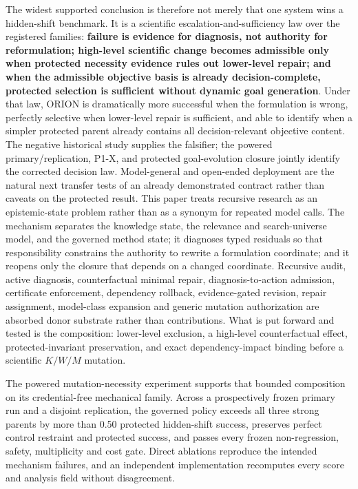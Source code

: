 The widest supported conclusion is therefore not merely that one system wins a hidden-shift benchmark. It is a scientific escalation-and-sufficiency law over the registered families: \textbf{failure is evidence for diagnosis, not authority for reformulation; high-level scientific change becomes admissible only when protected necessity evidence rules out lower-level repair; and when the admissible objective basis is already decision-complete, protected selection is sufficient without dynamic goal generation}. Under that law, ORION is dramatically more successful when the formulation is wrong, perfectly selective when lower-level repair is sufficient, and able to identify when a simpler protected parent already contains all decision-relevant objective content. The negative historical study supplies the falsifier; the powered primary/replication, P1-X, and protected goal-evolution closure jointly identify the corrected decision law. Model-general and open-ended deployment are the natural next transfer tests of an already demonstrated contract rather than caveats on the protected result.
This paper treats recursive research as an epistemic-state problem rather than
as a synonym for repeated model calls. The mechanism separates the knowledge
state, the relevance and search-universe model, and the governed method state;
it diagnoses typed residuals so that responsibility constrains the authority to
rewrite a formulation coordinate; and it reopens only the closure that depends
on a changed coordinate. Recursive audit, active diagnosis, counterfactual
minimal repair, diagnosis-to-action admission, certificate enforcement,
dependency rollback, evidence-gated revision, repair assignment, model-class
expansion and generic mutation authorization are absorbed donor substrate rather
than contributions. What is put forward and tested is the composition: lower-level
exclusion, a high-level counterfactual effect, protected-invariant preservation,
and exact dependency-impact binding before a scientific $K/W/M$ mutation.

The powered mutation-necessity experiment supports that bounded composition on
its credential-free mechanical family. Across a prospectively frozen primary run
and a disjoint replication, the governed policy exceeds all three strong parents
by more than 0.50 protected hidden-shift success, preserves perfect control
restraint and protected success, and passes every frozen non-regression, safety,
multiplicity and cost gate. Direct ablations reproduce the intended mechanism
failures, and an independent implementation recomputes every score and analysis
field without disagreement.

